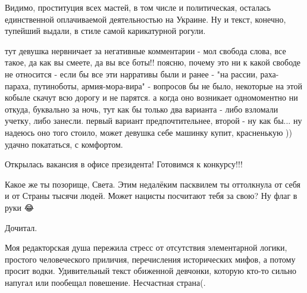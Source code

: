 \begin{itemize}
Видимо, проституция всех мастей, в том числе и политическая, осталась
единственной оплачиваемой деятельностью на Украине. Ну и текст, конечно,
тупейший выдали, в стиле самой карикатурной рогули.


 

тут девушка нервничает за негативные комментарии - мол свобода слова, все
такое, да как вы смеете, да вы все боты!! поясню, почему это ни к какой свободе
не относится - если бы все эти нарративы были и ранее - "на рассии,
раха-параха, путиноботы, армия-мора-вира" - вопросов бы не было, некоторые на
этой кобыле скачут всю дорогу и не парятся. а когда оно возникает одномоментно
ни откуда, буквально за ночь, тут как бы только два варианта - либо взломали
учетку, либо занесли. первый вариант предпочтительнее, второй - ну как бы... ну
надеюсь оно того стоило, может девушка себе машинку купит, красненькую ))
удачно покататься, с комфортом.

 
Открылась вакансия в офисе президента! Готовимся к конкурсу!!!

 
Какое же ты позорище, Света. Этим недалёким пасквилем ты оттолкнула от себя и от Страны тысячи людей. Может нацисты посчитают тебя за свою? Ну флаг в руки 😂

 

Дочитал.

Моя редакторская душа пережила стресс от отсутствия элементарной логики,
простого человеческого приличия, перечисления исторических мифов, а потому
просит водки. Удивительный текст обиженной девчонки, которую кто-то сильно
напугал или пообещал повешение. Несчастная страна(.



\end{itemize}
